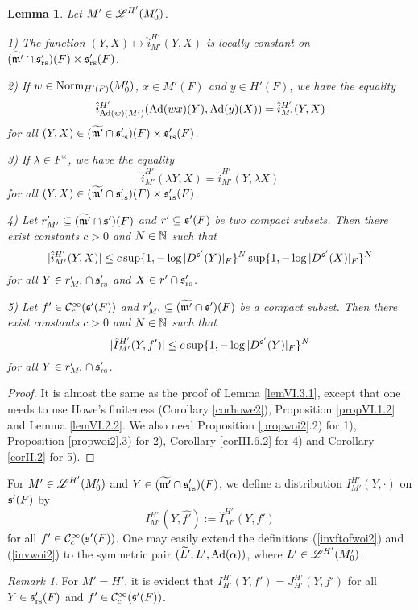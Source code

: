 \documentclass[a4paper]{amsart}
\newcommand{\fm}{{\mathfrak{m}}} \newcommand{\fn}{{\mathfrak{n}}}\newcommand{\fo}{{\mathfrak{o}}} \newcommand{\fp}{{\mathfrak{p}}}
\newcommand{\wt}{\widetilde}                        \newcommand{\wh}{\widehat}                      \newcommand{\wpair}[1]{\left\{{#1}\right\}}
\newtheorem{lem}[thm]{Lemma}
\theoremstyle{definition}
\theoremstyle{remark}
\newtheorem{remark}[thm]{Remark}
\numberwithin{equation}{subsection}
\begin{document}
\begin{lem}\label{lemVI.3.2}
Let $M'\in\mathscr{L}^{H'}(M'_0)$. 

1) The function $(Y, X)\mapsto\hat{i}_{M'}^{H'}(Y, X)$ is locally constant on $(\wt{\fm'}\cap\fs'_\rs)(F)\times\fs'_\rs(F)$. 

2) If $w\in{\mathrm{Norm}}_{H'(F)}(M'_0)$, $x\in M'(F)$ and $y\in H'(F)$, we have the equality
$$ \hat{i}_{{\mathrm{Ad}}(w)(M')}^{H'}({\mathrm{Ad}}(wx)(Y), {\mathrm{Ad}}(y)(X))=\hat{i}_{M'}^{H'}(Y, X) $$
for all $(Y, X)\in(\wt{\fm'}\cap\fs'_\rs)(F)\times\fs'_\rs(F)$. 

3) If $\lambda\in F^\times$, we have the equality
$$ \hat{i}_{M'}^{H'}(\lambda Y, X)=\hat{i}_{M'}^{H'}(Y, \lambda X) $$
for all $(Y, X)\in(\wt{\fm'}\cap\fs'_\rs)(F)\times\fs'_\rs(F)$. 

4) Let $r'_{M'}\subseteq(\wt{\fm'}\cap\fs')(F)$ and $r'\subseteq{\mathfrak{s}}'(F)$ be two compact subsets. Then there exist constants $c>0$ and $N\in{\mathbb {N}}$ such that
$$ |\hat{i}_{M'}^{H'}(Y, X)|\leq c\sup\{1, -\log|D^{{\mathfrak{s}}'}(Y)|_F\}^N \sup\{1, -\log|D^{{\mathfrak{s}}'}(X)|_F\}^N $$
for all $Y\in r'_{M'}\cap{\mathfrak{s}}'_{\mathrm{rs}}$ and $X\in r'\cap{\mathfrak{s}}'_{\mathrm{rs}}$. 

5) Let $f'\in{\mathcal {C}}_c^\infty({\mathfrak{s}}'(F))$ and $r'_{M'}\subseteq(\wt{\fm'}\cap\fs')(F)$ be a compact subset. Then there exist constants $c>0$ and $N\in{\mathbb {N}}$ such that
$$ |\hat{I}_{M'}^{H'}(Y, f')|\leq c\sup\{1, -\log|D^{{\mathfrak{s}}'}(Y)|_F\}^N $$
for all $Y\in r'_{M'}\cap{\mathfrak{s}}'_{\mathrm{rs}}$. 
\end{lem}

\begin{proof}
It is almost the same as the proof of Lemma \ref{lemVI.3.1}, except that one needs to use Howe's finiteness (Corollary \ref{corhowe2}), Proposition \ref{propVI.1.2} and Lemma \ref{lemVI.2.2}. We also need Proposition \ref{propwoi2}.2) for 1), Proposition \ref{propwoi2}.3) for 2), Corollary \ref{corIII.6.2} for 4) and Corollary \ref{corII.2} for 5). 
\end{proof}

For $M'\in\mathscr{L}^{H'}(M'_0)$ and $Y\in(\wt{\fm'}\cap\fs'_\rs)(F)$, we define a distribution $I_{M'}^{H'}(Y, \cdot)$ on ${\mathfrak{s}}'(F)$ by
\begin{equation}\label{invwoi2}
 I_{M'}^{H'}(Y, \hat{f'}):=\hat{I}_{M'}^{H'}(Y, f') 
\end{equation}
for all $f'\in{\mathcal {C}}_c^\infty({\mathfrak{s}}'(F))$. One may easily extend the definitions (\ref{invftofwoi2}) and (\ref{invwoi2}) to the symmetric pair $(\wt{L'}, L', \Ad(\alpha))$, where $L'\in\mathscr{L}^{H'}(M'_0)$. 

\begin{remark}
For $M'=H'$, it is evident that $I_{H'}^{H'}(Y, f')=J_{H'}^{H'}(Y, f')$ for all $Y\in{\mathfrak{s}}'_{\mathrm{rs}}(F)$ and $f'\in{\mathcal {C}}_c^\infty({\mathfrak{s}}'(F))$. 
\end{remark}
\end{document}
